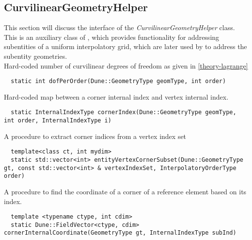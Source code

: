 \subsection{CurvilinearGeometryHelper}
\label{interface-geometry-helper}

\noindent
This section will discuss the interface of the \textit{CurvilinearGeometryHelper} class. This is an auxiliary class of \curvgeom{}, which provides functionality for addressing subentities of a uniform interpolatory grid, which are later used by \curvgeom{} to address the subentity geometries. \\


\noindent
Hard-coded number of curvilinear degrees of freedom as given in \ref{theory-lagrange}

\begin{mybox}
\begin{lstlisting}
  static int dofPerOrder(Dune::GeometryType geomType, int order)
\end{lstlisting}
\end{mybox}

\noindent
Hard-coded map between a corner internal index and vertex internal index.

\begin{mybox}
\begin{lstlisting}
  static InternalIndexType cornerIndex(Dune::GeometryType geomType, int order, InternalIndexType i)
\end{lstlisting}
\end{mybox}

\noindent
A procedure to extract corner indices from a vertex index set %

\begin{mybox}
\begin{lstlisting}
  template<class ct, int mydim>
  static std::vector<int> entityVertexCornerSubset(Dune::GeometryType gt, const std::vector<int> & vertexIndexSet, InterpolatoryOrderType order)
\end{lstlisting}
\end{mybox}

\noindent
A procedure to find the coordinate of a corner of a reference element based on its index. %

\begin{mybox}
\begin{lstlisting}
  template <typename ctype, int cdim>
  static Dune::FieldVector<ctype, cdim> cornerInternalCoordinate(GeometryType gt, InternalIndexType subInd)
\end{lstlisting}
\end{mybox}

